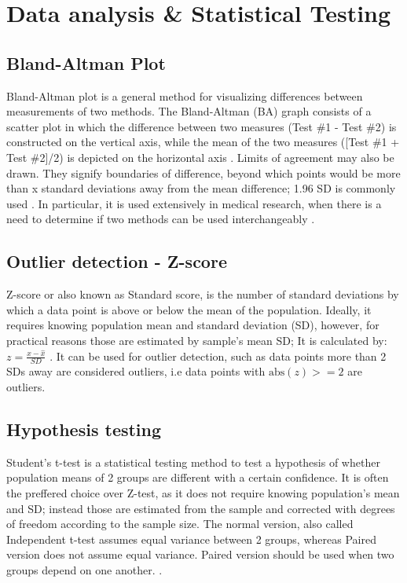 \section{Data analysis \& Statistical Testing}
\subsection{Bland-Altman Plot}
Bland-Altman plot is a general method for visualizing differences between measurements of two methods. The Bland-Altman (BA) graph consists of a scatter plot in which the difference between two measures (Test \#1 - Test \#2) is constructed on the vertical axis, while the mean of the two measures ([Test \#1 + Test \#2]/2) is depicted on the horizontal axis \cite{kaur2017bland}. Limits of agreement may also be drawn. They signify boundaries of difference, beyond which points would be more than x standard deviations away from the mean difference; 1.96 SD is commonly used \cite{myles2007using}.  In particular, it is used extensively in medical research, when there is a need to determine if two methods can be used interchangeably \cite{myles2007using}.
\subsection{Outlier detection - Z-score}
Z-score or also known as Standard score, is the number of standard deviations by which a data point is above or below the mean of the population. Ideally, it requires knowing population mean and standard deviation (SD), however, for practical reasons those are estimated by sample's mean SD; It is calculated by: $z=\frac{x-\hat{x}}{SD}$ \cite{zscoreBook}. It can be used for outlier detection, such as data points more than 2 SDs away are considered outliers, i.e data points with $\text{abs}(z) >= 2$ are outliers.
\subsection{Hypothesis testing}
Student's t-test is a statistical testing method to test a hypothesis of whether population means of 2 groups are different with a certain confidence. It is often the preffered choice over Z-test, as it does not require knowing population's mean and SD; instead those are estimated from the sample and corrected with degrees of freedom according to the sample size. The normal version, also called Independent t-test assumes equal variance between 2 groups, whereas Paired version does not assume equal variance. Paired version should be used when two groups depend on one another. \cite{LIVINGSTON200458}. 


